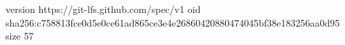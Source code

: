 version https://git-lfs.github.com/spec/v1
oid sha256:c758813fce0d5e0ce61ad865ce3e4e26860420880474045bf38e183256aa0d95
size 57
